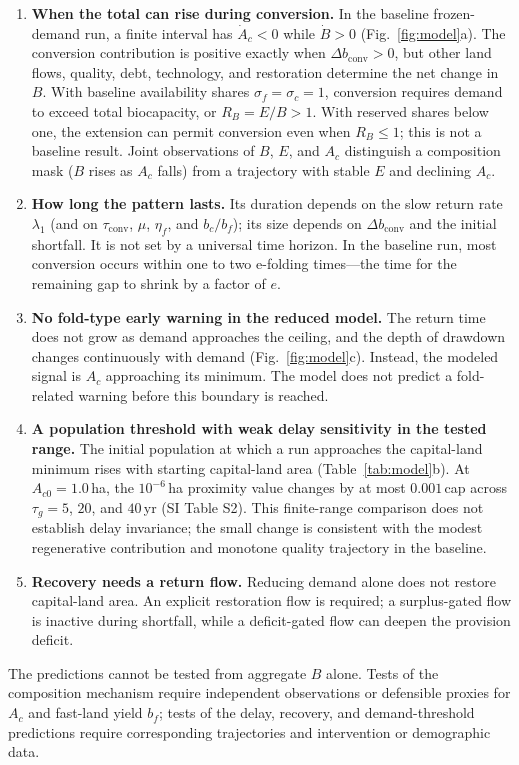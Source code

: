 \documentclass[preprint,12pt,authoryear]{elsarticle}
\newcommand{\dconv}{\Delta b_{\mathrm{conv}}}
\newcommand{\tconv}{\tau_{\mathrm{conv}}}
\begin{document}
\begin{enumerate}[label=P\arabic*.,leftmargin=2.2em]
\item \textbf{When the total can rise during conversion.} In the baseline frozen-demand run, a finite interval has $\dot A_c<0$ while $\dot B>0$ (Fig.~\ref{fig:model}a). The conversion contribution is positive exactly when $\dconv>0$, but other land flows, quality, debt, technology, and restoration determine the net change in $B$. With baseline availability shares $\sigma_f=\sigma_c=1$, conversion requires demand to exceed total biocapacity, or $R_B=E/B>1$. With reserved shares below one, the extension can permit conversion even when $R_B\le1$; this is not a baseline result. Joint observations of $B$, $E$, and $A_c$ distinguish a composition mask ($B$ rises as $A_c$ falls) from a trajectory with stable $E$ and declining $A_c$.
\item \textbf{How long the pattern lasts.} Its duration depends on the slow return rate $\lambda_1$ (and on $\tconv$, $\mu$, $\eta_f$, and $b_c/b_f$); its size depends on $\dconv$ and the initial shortfall. It is not set by a universal time horizon. In the baseline run, most conversion occurs within one to two e-folding times—the time for the remaining gap to shrink by a factor of $e$.
\item \textbf{No fold-type early warning in the reduced model.} The return time does not grow as demand approaches the ceiling, and the depth of drawdown changes continuously with demand (Fig.~\ref{fig:model}c). Instead, the modeled signal is $A_c$ approaching its minimum. The model does not predict a fold-related warning before this boundary is reached.
\item \textbf{A population threshold with weak delay sensitivity in the tested range.} The initial population at which a run approaches the capital-land minimum rises with starting capital-land area (Table~\ref{tab:model}b). At $A_{c0}=1.0$\,ha, the $10^{-6}$\,ha proximity value changes by at most $0.001$\,cap across $\tau_g=5$, $20$, and $40$\,yr (SI Table S2). This finite-range comparison does not establish delay invariance; the small change is consistent with the modest regenerative contribution and monotone quality trajectory in the baseline.
\item \textbf{Recovery needs a return flow.} Reducing demand alone does not restore capital-land area. An explicit restoration flow is required; a surplus-gated flow is inactive during shortfall, while a deficit-gated flow can deepen the provision deficit.
\end{enumerate}
The predictions cannot be tested from aggregate $B$ alone. Tests of the composition mechanism require independent observations or defensible proxies for $A_c$ and fast-land yield $b_f$; tests of the delay, recovery, and demand-threshold predictions require corresponding trajectories and intervention or demographic data.
\clearpage
\end{document}
